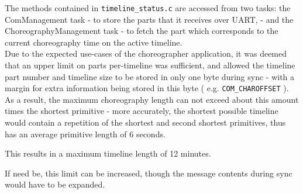 The methods contained in \texttt{timeline\_status.c} are accessed from two tasks: the ComManagement task - to store the parts that it receives over UART, - and the ChoreographyManagement task - to fetch the part which corresponds to the current choreography time on the active timeline.\\

Due to the expected use-cases of the choreographer application, it was deemed that an upper limit on parts per-timeline was sufficient, and allowed the timeline part number and timeline size to be stored in only one byte during sync - with a margin for extra information being stored in this byte ( e.g. \texttt{COM\_CHAROFFSET} ). As a result, the maximum choreography length can not exceed about this amount times the shortest primitive - more accurately, the shortest possible timeline would contain a repetition of the shortest and second shortest primitives, thus has an average primitive length of 6 seconds. 

This results in a maximum timeline length of 12 minutes. 

If need be, this limit can be increased, though the message contents during sync would have to be expanded.
    



